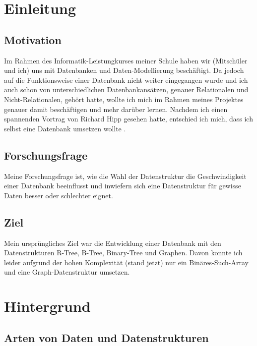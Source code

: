 \documentclass[11pt,a4paper]{article}
\begin{document}
\clearpage

\pagestyle{plain}

\section{Einleitung}

\subsection{Motivation}

Im Rahmen des Informatik-Leistungkurses meiner Schule haben wir (Mitschüler und ich) uns
mit Datenbanken und Daten-Modellierung beschäftigt. Da jedoch auf die Funktionsweise einer
Datenbank nicht weiter eingegangen wurde und ich auch schon von unterschiedlichen
Datenbankansätzen, genauer Relationalen und Nicht-Relationalen, gehört hatte,
wollte ich mich im Rahmen meines Projektes genauer damit beschäftigen
und mehr darüber lernen.
Nachdem ich einen spannenden Vortrag von Richard Hipp gesehen hatte,
entschied ich mich, dass ich selbst eine Datenbank umsetzen wollte \cite{sql_ideas}.

\subsection{Forschungsfrage}

Meine Forschungsfrage ist, wie die Wahl der Datenstruktur die
Geschwindigkeit einer Datenbank beeinflusst und inwiefern sich eine Datenstruktur
für gewisse Daten besser oder schlechter eignet.

\subsection{Ziel}

Mein ursprüngliches Ziel war die Entwicklung einer Datenbank
mit den Datenstrukturen R-Tree, B-Tree, Binary-Tree und Graphen.
Davon konnte ich leider aufgrund der hohen Komplexität (stand jetzt) nur ein
Binäres-Such-Array und eine Graph-Datenstruktur umsetzen.

\clearpage

\section{Hintergrund}

\subsection{Arten von Daten und Datenstrukturen}
\end{document}
